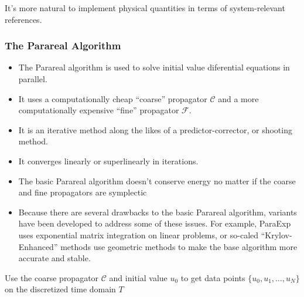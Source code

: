 \documentclass{article}
\begin{document}
            It's more natural to implement physical quantities in terms of system-relevant references.

        \subsubsection{The Parareal Algorithm}

            \begin{itemize}
                \item The Parareal algorithm is used to solve initial value diferential equations in parallel.
                \item It uses a computationally cheap ``coarse'' propagator $\mathcal{C}$ and a more computationally expensive ``fine'' propagator $\mathcal{F}$.
                \item It is an iterative method along the likes of a predictor-corrector, or shooting method.
                \item It converges linearly or superlinearly in iterations.
                \item The basic Parareal algorithm doesn't conserve energy no matter if the coarse and fine propagators are symplectic
                \item Because there are several drawbacks to the basic Parareal algorithm, variants have been developed to address some of these issues.  For example, ParaExp uses exponential matrix integration on linear problems, or so-caled ``Krylov-Enhanced'' methods use geometric methods to make the base algorithm more accurate and stable.
            \end{itemize}

            \begin{algorithm}
                \caption{The Parareal Algorithm}
                Use the coarse propagator $\mathcal{C}$ and initial value $u_0$ to get data points $\{u_0, u_1, \ldots, u_N\}$ on the discretized time domain $T$\;
                
            \end{algorithm}
\end{document}
